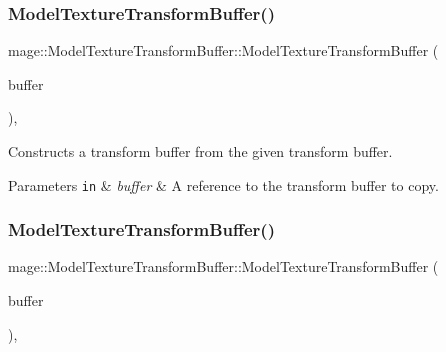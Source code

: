 \subsubsection{\texorpdfstring{Model\+Texture\+Transform\+Buffer()}{ModelTextureTransformBuffer()}\hspace{0.1cm}{\footnotesize\ttfamily [2/3]}}
{\footnotesize\ttfamily mage\+::\+Model\+Texture\+Transform\+Buffer\+::\+Model\+Texture\+Transform\+Buffer (\begin{DoxyParamCaption}\item[{const \hyperlink{structmage_1_1_model_texture_transform_buffer}{Model\+Texture\+Transform\+Buffer} \&}]{buffer }\end{DoxyParamCaption})\hspace{0.3cm}{\ttfamily [default]}, {\ttfamily [noexcept]}}

Constructs a transform buffer from the given transform buffer.


\begin{DoxyParams}[1]{Parameters}
\mbox{\tt in}  & {\em buffer} & A reference to the transform buffer to copy. \\
\hline
\end{DoxyParams}
\hypertarget{structmage_1_1_model_texture_transform_buffer_a90eaca1a29930ec51a3cd50bee212f57}{}\label{structmage_1_1_model_texture_transform_buffer_a90eaca1a29930ec51a3cd50bee212f57} 
\subsubsection{\texorpdfstring{Model\+Texture\+Transform\+Buffer()}{ModelTextureTransformBuffer()}\hspace{0.1cm}{\footnotesize\ttfamily [3/3]}}
{\footnotesize\ttfamily mage\+::\+Model\+Texture\+Transform\+Buffer\+::\+Model\+Texture\+Transform\+Buffer (\begin{DoxyParamCaption}\item[{\hyperlink{structmage_1_1_model_texture_transform_buffer}{Model\+Texture\+Transform\+Buffer} \&\&}]{buffer }\end{DoxyParamCaption})\hspace{0.3cm}{\ttfamily [default]}, {\ttfamily [noexcept]}}

